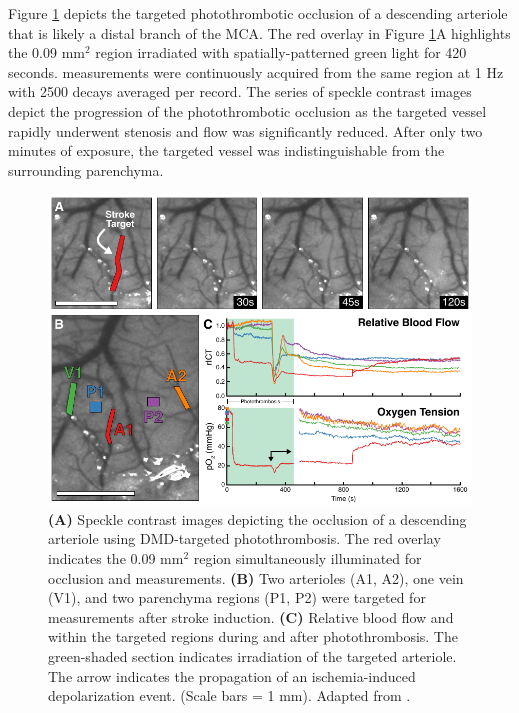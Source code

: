 Figure \ref{fig:photothrombosisacute} depicts the targeted photothrombotic occlusion of a descending arteriole that is likely a distal branch of the MCA. The red overlay in Figure \ref{fig:photothrombosisacute}A highlights the 0.09 mm$^2$ region irradiated with spatially-patterned green light for 420 seconds.  measurements were continuously acquired from the same region at 1 Hz with 2500 decays averaged per record. The series of speckle contrast images depict the progression of the photothrombotic occlusion as the targeted vessel rapidly underwent stenosis and flow was significantly reduced. After only two minutes of exposure, the targeted vessel was indistinguishable from the surrounding parenchyma.

\begin{figure}
    \includegraphics{figures/chapter_3/photothrombosisacute.pdf}
    \caption[\textbf{(A)} Speckle contrast images depicting the occlusion of a descending arteriole using DMD-targeted photothrombosis. The red overlay indicates the 0.09 mm$^2$ region simultaneously illuminated for occlusion and  measurements. \textbf{(B)} Two arterioles (A1, A2), one vein (V1), and two parenchyma regions (P1, P2) were targeted for  measurements after stroke induction. \textbf{(C)} Relative blood flow and  within the targeted regions during and after photothrombosis. The green-shaded section indicates irradiation of the targeted arteriole. The arrow indicates the propagation of an ischemia-induced depolarization event. (Scale bars = 1 mm).]{
        \label{fig:photothrombosisacute}
        \textbf{(A)} Speckle contrast images depicting the occlusion of a descending arteriole using DMD-targeted photothrombosis. The red overlay indicates the 0.09 mm$^2$ region simultaneously illuminated for occlusion and  measurements. \textbf{(B)} Two arterioles (A1, A2), one vein (V1), and two parenchyma regions (P1, P2) were targeted for  measurements after stroke induction. \textbf{(C)} Relative blood flow and  within the targeted regions during and after photothrombosis. The green-shaded section indicates irradiation of the targeted arteriole. The arrow indicates the propagation of an ischemia-induced depolarization event. (Scale bars = 1 mm). Adapted from \cite{Sullender:2018ff}.
    }
\end{figure}

